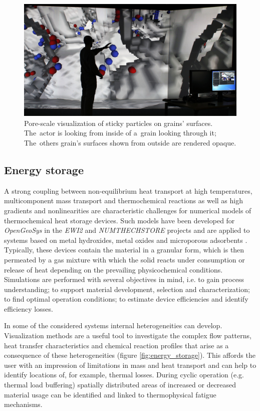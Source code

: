 \documentclass[twocolumn]{svjour3}          %
\begin{document}
\begin{figure}[htb]
  \includegraphics[width=\linewidth]{images/porescale_vislab.jpg}
  \caption{Pore-scale visualization of sticky particles on grains' surfaces.
  The~actor is looking from inside of a~grain looking through it; The~others
  grain's surfaces shown from outside are rendered opaque.}
\label{fig:porescale}
\end{figure}


\subsection{Energy storage}
\label{energy-storage}

A strong coupling between non-equilibrium heat transport at high temperatures, multicomponent mass transport and thermochemical reactions as well as high gradients and nonlinearities are characteristic challenges for numerical models of thermochemical heat storage devices. Such models have been developed for \emph{OpenGeoSys} in the \emph{EWI2} and \emph{NUMTHECHSTORE} projects and are applied to systems based on metal hydroxides, metal oxides and microporous adsorbents \cite{Nagel2013, Shao2013}. Typically, these devices contain the material in a granular form, which is then permeated by a gas mixture with which the solid reacts under consumption or release of heat depending on the prevailing physicochemical conditions. Simulations are performed with several objectives in mind, i.e. to gain process understanding; to support material development, selection and characterization; to find optimal operation conditions; to estimate device efficiencies and identify efficiency losses.

In some of the considered systems internal heterogeneities can develop. Visualization methods are a useful tool to investigate the complex flow patterns, heat transfer characteristics and chemical reaction profiles that arise as a consequence of these heterogeneities (figure \ref{fig:energy_storage}). This affords the user with an impression of limitations in mass and heat transport and can help to identify locations of, for example, thermal losses. During cyclic operation (e.g. thermal load buffering) spatially distributed areas of increased or decreased material usage can be identified and linked to thermophysical fatigue mechanisms.
\end{document}
